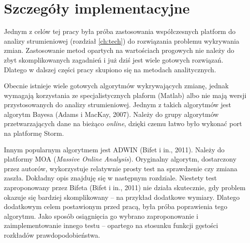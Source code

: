 \section{Szczegóły implementacyjne}
Jednym z celów tej pracy była próba zastosowania współczesnych platform do analizy strumieniowej (rozdział \ref{ch:tech})
do rozwiązania problemu wykrywania zmian.
Zastosowanie metod opartych na wartościach progowych nie należy do zbyt skomplikowanych zagadnień
i już dziś jest wiele gotowych rozwiązań.
Dlatego w dalszej części pracy skupiono się na metodach analitycznych.

Obecnie istnieje wiele gotowych algorytmów wykrywających zmianę,
jednak wymagają korzystania ze specjalistycznych plaform (Matlab) albo nie mają wersji
przystosowanych do analizy strumieniowej.
Jednym z takich algorytmów jest algorytm Bayesa (Adams i MacKay, 2007).
Należy do grupy algorytmów przetwarzających dane na bieżąco \textit{online},
dzięki czemu łatwo było wykonać port na platformę Storm.

Innym popularnym algorytmem jest ADWIN (Bifet i in., 2011).
Należy do platformy MOA (\textit{Massive Online Analysis}).
Oryginalny algorytm, dostarczony przez autorów,
wykorzystuje relatywnie prosty test na sprawdzenie czy zmiana zaszła.
Dokładny opis znajduję się w następnym rozdziale.
Niestety test zaproponowany przez Bifeta (Bifet i in., 2011) nie działa skutecznie,
gdy problem okazuje się bardziej skomplikowany -- na przykład dodatkowe wymiary.
Dlatego dodatkowym celem postawionym przed pracą,
była próba poprawienia tego algorytmu.
Jako sposób osiągnięcia go wybrano zaproponowanie i zaimplementowanie innego testu --
opartego na stosunku funkcji gęstości rozkładów prawdopodobieństwa.
